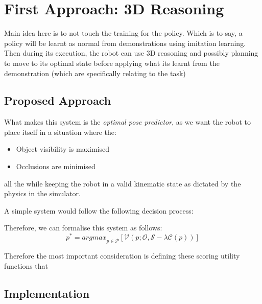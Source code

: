 \section{First Approach: 3D Reasoning}
Main idea here is to not touch the training for the policy. Which is to say, a policy will be learnt as normal from demonstrations using imitation learning. Then during its execution, the robot can use 3D reasoning and possibly planning to move to its optimal state before applying what its learnt from the demonstration (which are specifically relating to the task)

\subsection{Proposed Approach}
What makes this system is the \emph{optimal pose predictor}, as we want the robot to place itself in a situation where the:
\begin{itemize}
  \item Object visibility is maximised
  \item Occlusions are minimised
\end{itemize}
all the while keeping the robot in a valid kinematic state as dictated by the physics in the simulator.


A simple system would follow the following decision process:

Therefore, we can formalise this system as follows:
\[
p^* = {argmax}_{p \in \mathcal{P}}
  \left[
    \mathcal{V}(p; \mathcal{O}, \mathcal{S} 
    - 
    \lambda\mathcal{C}(p))
  \right]
\]

Therefore the most important consideration is defining these scoring utility functions that 

\subsection{Implementation}
